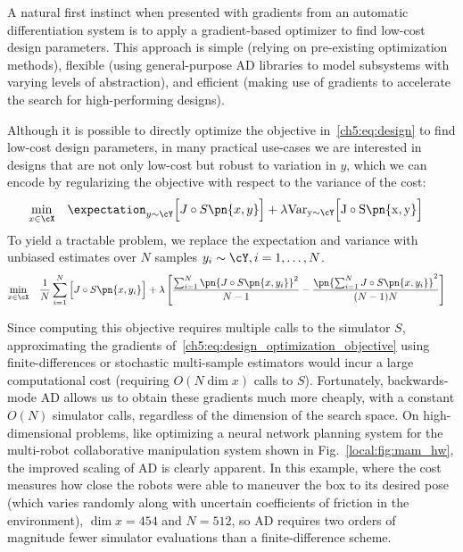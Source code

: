 A natural first instinct when presented with gradients from an automatic differentiation system is to apply a gradient-based optimizer to find low-cost design parameters. This approach is simple (relying on pre-existing optimization methods), flexible (using general-purpose AD libraries to model subsystems with varying levels of abstraction), and efficient (making use of gradients to accelerate the search for high-performing designs).

Although it is possible to directly optimize the objective in~\eqref{ch5:eq:design} to find low-cost design parameters, in many practical use-cases we are interested in designs that are not only low-cost but robust to variation in $y$, which we can encode by regularizing the objective with respect to the variance of the cost:
%
\begin{subequations}\label{ch5:eq:design_optimization_nlp_generic}
    \begin{align}
        \min_{x \in \cX} & \quad \expectation_{y \sim \cY} \Big[ J\circ S\pn{x, y} \Big] + \lambda \rm{Var}_{y\sim\cY}\Big[ J\circ S\pn{x, y} \Big] \label{ch5:eq:design_optimization_objective_generic}
    \end{align}
\end{subequations}
%
To yield a tractable problem, we replace the expectation and variance with unbiased estimates over $N$ samples $y_i \sim \cY, i=1,\ldots,N$.
%
\begin{subequations}\label{ch5:eq:design_optimization_nlp}
    \begin{align}
        \min_{x \in \cX} & \quad \frac{1}{N}\sum_{i=1}^{N} \Big[J\circ S\pn{x, y_i}\Big] + \lambda \left[ \frac{\sum_{i=1}^N \pn{J\circ S\pn{x, y_i}}^2}{N-1} - \frac{\pn{\sum_{i=1}^N J\circ S\pn{x, y_i}}^2}{(N-1)N} \right] \label{ch5:eq:design_optimization_objective}
    \end{align}
\end{subequations}

Since computing this objective requires multiple calls to the simulator $S$, approximating the gradients of~\eqref{ch5:eq:design_optimization_objective} using finite-differences or stochastic multi-sample estimators would incur a large computational cost (requiring $O(N\dim{x})$ calls to $S$). Fortunately, backwards-mode AD allows us to obtain these gradients much more cheaply, with a constant $O(N)$ simulator calls, regardless of the dimension of the search space. On high-dimensional problems, like optimizing a neural network planning system for the multi-robot collaborative manipulation system shown in Fig.~\ref{local:fig:mam_hw}, the improved scaling of AD is clearly apparent. In this example, where the cost measures how close the robots were able to maneuver the box to its desired pose (which varies randomly along with uncertain coefficients of friction in the environment), $\dim{x} = 454$ and $N = 512$, so AD requires two orders of magnitude fewer simulator evaluations than a finite-difference scheme.

